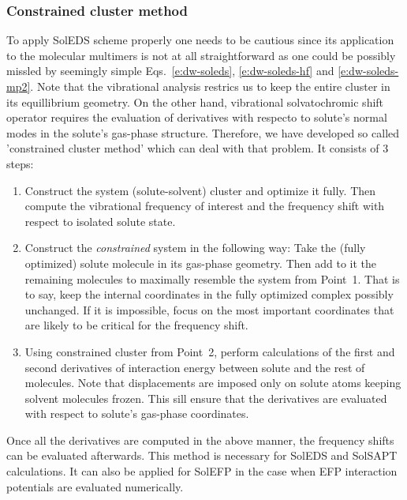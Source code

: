 \documentclass[a4paper,titlepage,twoside,fleqn,12pt]{book}
\begin{document}
\begin{appendices}
\begin{refsection}
\subsubsection{Constrained cluster method\label{a:constrained-models}}

To apply SolEDS scheme properly one needs to be cautious 
since its application to the molecular multimers is not at all
straightforward as one could be possibly missled by seemingly simple
Eqs.~\eqref{e:dw-soleds}, \eqref{e:dw-soleds-hf} and \eqref{e:dw-soleds-mp2}. 
Note that the vibrational analysis restrics us to keep the entire cluster
in its equillibrium geometry. On the other hand, vibrational
solvatochromic shift operator requires the evaluation of derivatives
with respecto to solute's normal modes in the solute's gas\hyp{}phase
structure. Therefore, we have developed so called 'constrained cluster method'
which can deal with that problem. It consists of 3 steps:
%
\begin{enumerate}
 \item Construct the system (solute\hyp{}solvent) cluster and
       optimize it fully. Then compute the vibrational frequency
       of interest and the frequency shift with respect to isolated
       solute state.
 \item Construct the \emph{constrained} system in the following way:
       Take the (fully optimized) solute molecule in its gas\hyp{}phase
       geometry. Then add to it the remaining molecules to maximally resemble
       the system from Point~1. That is to say, keep the internal coordinates
       in the fully optimized complex possibly unchanged. If it is impossible,
       focus on the most important coordinates that are likely to be critical
       for the frequency shift.
 \item Using constrained cluster from Point~2, perform calculations 
       of the first and second derivatives of interaction energy between
       solute and the rest of molecules. Note that displacements
       are imposed only on solute atoms keeping solvent
       molecules frozen. This sill ensure that the derivatives are evaluated
       with respect to solute's gas\hyp{}phase coordinates.
\end{enumerate}
%
Once all the derivatives are computed in the above manner, the frequency shifts
can be evaluated afterwards. This method is necessary for SolEDS
and SolSAPT calculations. It can also be applied for SolEFP
in the case when EFP interaction potentials are evaluated numerically.


\end{refsection}
\end{appendices}
\end{document}

